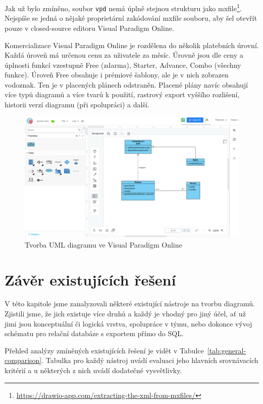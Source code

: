 Jak už bylo zmíněno, soubor \texttt{vpd} nemá úplně stejnou strukturu jako mxfile\footnote{\url{https://drawio-app.com/extracting-the-xml-from-mxfiles/}}.
Nejspíše se jedná o nějaké proprietární zakódování mxfile souboru, aby šel otevřít pouze v closed-source editoru Visual Paradigm Online.

Komercializace Visual Paradigm Online je rozdělena do několik platebních úrovní.
Každá úroveň má určenou cenu za uživatele za měsíc.
Úrovně jsou dle ceny a úplnosti funkcí vzestupně Free (zdarma), Starter, Advance, Combo (všechny funkce).
Úroveň Free obsahuje i prémiové šablony, ale je v nich zobrazen vodoznak.
Ten je v placených plánech odstraněn.
Placené plány navíc obsahují více typů diagramů a více tvarů k použití, rastrový export vyššího rozlišení, historii verzí diagramu (při spolupráci) a další.

\begin{figure}[htb]
  \centering
  \includegraphics[width = \maxwidth{\textwidth}]{../img/visual-paradigm-online.png}
  \caption{Tvorba UML diagramu ve Visual Paradigm Online}
  \label{fig:vpo}
\end{figure}
\section{Závěr existujících řešení}

V této kapitole jsme zanalyzovali některé existující nástroje na tvorbu diagramů.
Zjistili jsme, že jich existuje více druhů a každý je vhodný pro jiný účel, ať už jimi jsou konceptuální či logická vrstva, spolupráce v týmu, nebo dokonce vývoj schématu pro relační databáze s exportem přímo do SQL.

Přehled analýzy zmíněných existujících řešení je vidět v Tabulce~\ref{tab:general-comparison}.
Tabulka pro každý nástroj uvádí evaluaci jeho hlavních srovnávacích kritérií a u některých z nich uvádí dodatečné vysvětlivky.

